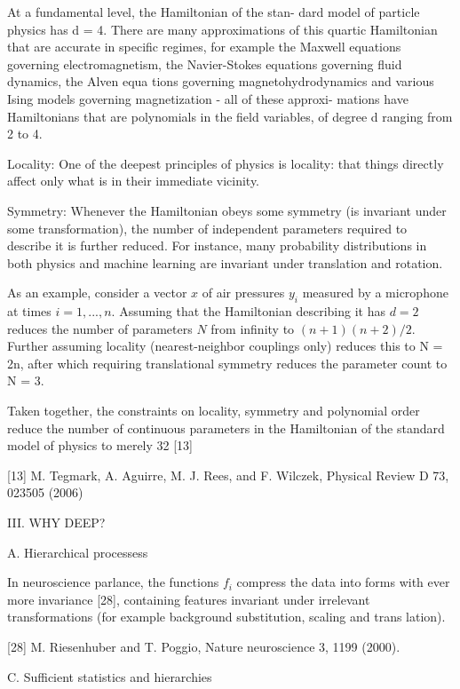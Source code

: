 \documentclass[english]{article}
\begin{document}
At a fundamental level, the Hamiltonian of the stan-
dard model of particle physics has d = 4. There are
many approximations of this quartic Hamiltonian that
are accurate in specific regimes, for example the Maxwell
equations governing electromagnetism, the Navier-Stokes
equations governing fluid dynamics, the Alven equa
tions governing magnetohydrodynamics and various Ising
models governing magnetization - all of these approxi-
mations have Hamiltonians that are polynomials in the
field variables, of degree d ranging from 2 to 4.

\item 
Locality: One of the deepest principles of physics is locality: that things directly affect only what is in their immediate
vicinity.

\item Symmetry:
Whenever the Hamiltonian obeys some symmetry (is invariant under some transformation), the number of independent parameters required to describe it is further
reduced. For instance, many probability distributions in
both physics and machine learning are invariant under
translation and rotation. 

As an example, consider a vector $x$ of air pressures $y_i$ measured by a microphone at
times $i = 1,...,n$. Assuming that the Hamiltonian describing it has $d = 2$ reduces the number of parameters
$N$ from infinity to $(n + 1)(n + 2)/2$. Further assuming locality (nearest-neighbor couplings only) reduces this to
N = 2n, after which requiring translational symmetry
reduces the parameter count to N = 3. 

Taken together,
the constraints on locality, symmetry and polynomial order reduce the number of continuous parameters in the
Hamiltonian of the standard model of physics to merely
32 [13]


[13] M. Tegmark, A. Aguirre, M. J. Rees, and F. Wilczek,
Physical Review D 73, 023505 (2006)


\item III. WHY DEEP?

A. Hierarchical processess

In neuroscience parlance, the functions $f_i$ compress the
data into forms with ever more invariance [28], containing features invariant under irrelevant transformations
(for example background substitution, scaling and trans
lation).

[28] M. Riesenhuber and T. Poggio, Nature neuroscience 3, 1199 (2000).

C. Sufficient statistics and hierarchies
\end{document}
